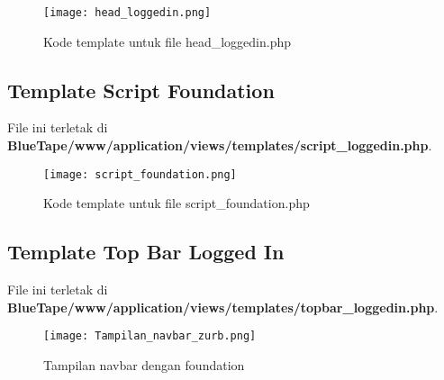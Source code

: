 \begin{figure} [H]
	\centering  
	\texttt{[image: head\_loggedin.png]}  
	\caption{Kode template untuk file head\_loggedin.php} 
\end{figure}

\subsection{Template Script Foundation}
File ini terletak di \textbf{BlueTape/www/application/views/templates/script\_loggedin.php}.
 
\begin{figure} [H]
	\centering  
	\texttt{[image: script\_foundation.png]}  
	\caption{Kode template untuk file script\_foundation.php} 
\end{figure}
\subsection{Template Top Bar Logged In}
File ini terletak di \textbf{BlueTape/www/application/views/templates/topbar\_loggedin.php}.
\begin{figure} [H]
	\centering  
	\texttt{[image: Tampilan\_navbar\_zurb.png]}  
	\caption{Tampilan navbar dengan foundation} 
\end{figure}
